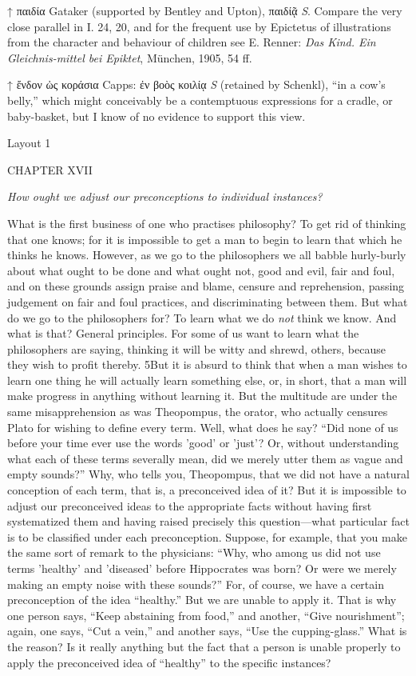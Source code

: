 ↑ παιδία Gataker (supported by Bentley and Upton), παιδίᾷ \emph{S}. Compare the very close parallel in I. 24, 20, and for the frequent use by Epictetus of illustrations from the character and behaviour of children see E. Renner: \emph{Das Kind. Ein Gleichnis-mittel bei Epiktet}, München, 1905, 54 ff.

↑ ἔνδον ὠς κοράσια Capps: ἐν βοὸς κοιλίᾳ \emph{S} (retained by Schenkl), ``in a cow's belly,'' which might conceivably be a contemptuous expressions for a cradle, or baby-basket, but I know of no evidence to support this view.


Layout 1

CHAPTER XVII

\emph{How ought we adjust our preconceptions to individual instances?}

What is the first business of one who practises philosophy? To get rid of thinking that one knows; for it is impossible to get a man to begin to learn that which he thinks he knows. However, as we go to the philosophers we all babble hurly-burly about what ought to be done and what ought not, good and evil, fair and foul, and on these grounds assign praise and blame, censure and reprehension, passing judgement on fair and foul practices, and discriminating between them. But what do we go to the philosophers for? To learn what we do \emph{not} think we know. And what is that? General principles. For some of us want to learn what the philosophers are saying, thinking it will be witty and shrewd, others, because they wish to profit thereby. 5But it is absurd to think that when a man wishes to learn one thing he will actually learn something else, or, in short, that a man will make progress in anything without learning it. But the multitude are under the same misapprehension as was Theopompus, the orator, who actually censures Plato for wishing to define every term. Well, what does he say? ``Did none of us before your time ever use the words 'good' or 'just'? Or, without understanding what each of these terms severally mean, did we merely utter them as vague and empty sounds?'' Why, who tells you, Theopompus, that we did not have a natural conception of each term, that is, a preconceived idea of it? But it is impossible to adjust our preconceived ideas to the appropriate facts without having first systematized them and having raised precisely this question—what particular fact is to be classified under each preconception. Suppose, for example, that you make the same sort of remark to the physicians: ``Why, who among us did not use terms 'healthy' and 'diseased' before Hippocrates was born? Or were we merely making an empty noise with these sounds?'' For, of course, we have a certain preconception of the idea ``healthy.'' But we are unable to apply it. That is why one person says, ``Keep abstaining from food,'' and another, ``Give nourishment''; again, one says, ``Cut a vein,'' and another says, ``Use the cupping-glass.'' What is the reason? Is it really anything but the fact that a person is unable properly to apply the preconceived idea of ``healthy'' to the specific instances?

